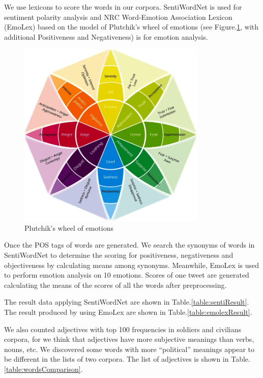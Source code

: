 We use lexicons to score the words in our corpora. SentiWordNet is used for sentiment polarity analysis and NRC Word-Emotion Association Lexicon (EmoLex) \citep{Mohammad13} based on the model of Plutchik’s wheel of emotions \citep{plutchik2003emotions} (see Figure.\ref{fig:wheel}, with additional Positiveness and Negativeness) is for emotion analysis.

\begin{figure}[h]
  \centering
  \includegraphics[width=0.8\textwidth]{images/wheel-of-emotions.jpg}
  \caption{Plutchik’s wheel of emotions}
  \label{fig:wheel}
\end{figure}

Once the POS tags of words are generated. We search the synonyms of words in SentiWordNet to determine the scoring for positiveness, negativeness and objectiveness by calculating means among synonyms. Meanwhile, EmoLex is used to perform emotion analysis on 10 emotions. Scores of one tweet are generated calculating the means of the scores of all the words after preprocessing.

The result data applying SentiWordNet are shown in Table.\ref{table:sentiResult}.
The result produced by using EmoLex are shown in Table.\ref{table:emolexResult}.

We also counted adjectives with top 100 frequencies in soldiers and civilians corpora, for we think that adjectives have more subjective meanings than verbs, nouns, etc. We discovered some words with more \enquote{political} meanings appear to be different in the lists of two corpora. The list of adjectives is shown in Table.\ref{table:wordsComparison}.


